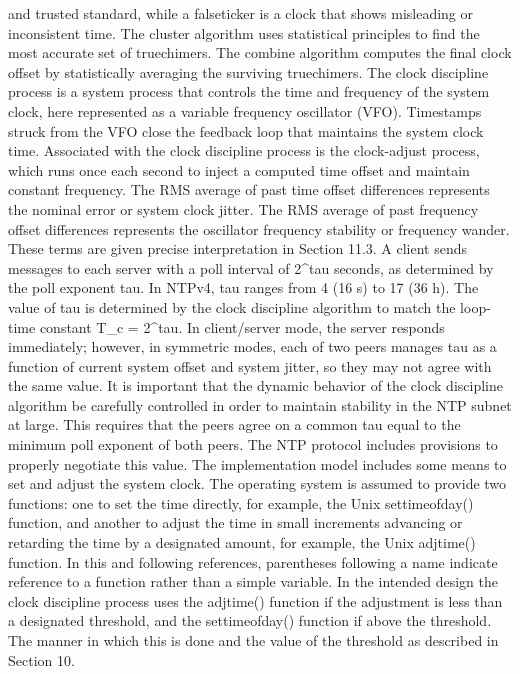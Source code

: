  and trusted standard, while a falseticker is a clock that shows
 misleading or inconsistent time. The cluster algorithm uses
 statistical principles to find the most accurate set of truechimers.
 The combine algorithm computes the final clock offset by
 statistically averaging the surviving truechimers.
 The clock discipline process is a system process that controls the
 time and frequency of the system clock, here represented as a
 variable frequency oscillator (VFO). Timestamps struck from the VFO
 close the feedback loop that maintains the system clock time.
 Associated with the clock discipline process is the clock-adjust
 process, which runs once each second to inject a computed time offset
 and maintain constant frequency. The RMS average of past time offset
 differences represents the nominal error or system clock jitter. The
 RMS average of past frequency offset differences represents the
 oscillator frequency stability or frequency wander. These terms are
 given precise interpretation in Section 11.3.
 A client sends messages to each server with a poll interval of 2^tau
 seconds, as determined by the poll exponent tau. In NTPv4, tau
 ranges from 4 (16 s) to 17 (36 h). The value of tau is determined by
 the clock discipline algorithm to match the loop-time constant T_c =
 2^tau. In client/server mode, the server responds immediately;
 however, in symmetric modes, each of two peers manages tau as a
 function of current system offset and system jitter, so they may not
 agree with the same value. It is important that the dynamic behavior
 of the clock discipline algorithm be carefully controlled in order to
 maintain stability in the NTP subnet at large. This requires that
the peers agree on a common tau equal to the minimum poll exponent of
 both peers. The NTP protocol includes provisions to properly
 negotiate this value.
 The implementation model includes some means to set and adjust the
 system clock. The operating system is assumed to provide two
 functions: one to set the time directly, for example, the Unix
 settimeofday() function, and another to adjust the time in small
 increments advancing or retarding the time by a designated amount,
 for example, the Unix adjtime() function. In this and following
 references, parentheses following a name indicate reference to a
 function rather than a simple variable. In the intended design the
 clock discipline process uses the adjtime() function if the
 adjustment is less than a designated threshold, and the
 settimeofday() function if above the threshold. The manner in which
 this is done and the value of the threshold as described in
 Section 10.
